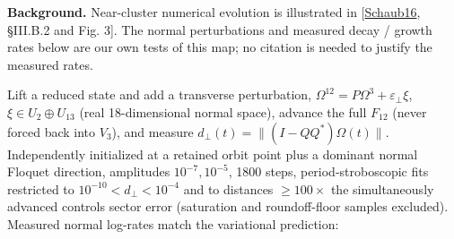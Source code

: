 \documentclass[
  11pt,
  a4paper,
]{article}
\begin{document}
\textbf{Background.} Near-cluster numerical evolution is illustrated in {[}\hyperlink{ref-Schaub16}{Schaub16}, §III.B.2 and Fig. 3{]}. The normal perturbations and measured decay / growth rates below are our own tests of this map; no citation is needed to justify the measured rates.

Lift a reduced state and add a transverse perturbation, \(\Omega^{12}=P\Omega^{3}+\varepsilon_\perp\xi\), \(\xi\in U_2\oplus U_{13}\) (real 18-dimensional normal space), advance the full \(F_{12}\) (never forced back into \(V_3\)), and measure \(d_\perp(t)=\|(I-QQ^\ast)\Omega(t)\|\). Independently initialized at a retained orbit point plus a dominant normal Floquet direction, amplitudes \(10^{-7},10^{-5}\), 1800 steps, period-stroboscopic fits restricted to \(10^{-10}<d_\perp<10^{-4}\) and to distances \(\ge100\times\) the simultaneously advanced control\textquotesingle s sector error (saturation and roundoff-floor samples excluded). Measured normal log-rates match the variational prediction:

\begingroup\fontsize{9.3}{12}\selectfont\setlength{\tabcolsep}{4pt}\renewcommand{\arraystretch}{1.18}
\end{document}
